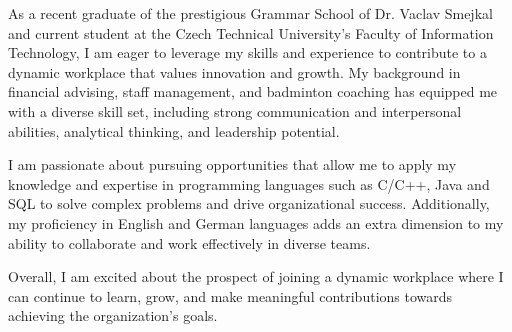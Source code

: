 \documentclass[9pt]{developercv} %
\begin{document}
\vspace{0.5cm}



\begin{minipage}[t]{0.6\textwidth} %
	\vspace{-\baselineskip} %
	
	As a recent graduate of the prestigious Grammar School of Dr. Vaclav Smejkal and current student at the Czech Technical University's Faculty of Information Technology, 
	I am eager to leverage my skills and experience to contribute to a dynamic workplace that values innovation and growth. My background in financial advising, staff management,
	 and badminton coaching has equipped me with a diverse skill set, including strong communication and interpersonal abilities, analytical thinking, and leadership potential.

	I am passionate about pursuing opportunities that allow me to apply my knowledge and expertise in programming languages such as C/C++, Java and SQL
	 to solve complex problems and drive organizational success. Additionally, my proficiency in English and German languages adds an extra dimension to my ability to collaborate and work effectively in
	  diverse teams.

	Overall, I am excited about the prospect of joining a dynamic workplace where I can continue to learn, grow, and make meaningful contributions towards achieving the organization's goals.\\
\end{minipage}
\hfill %
\begin{minipage}[t]{0.4\textwidth} %
	\vspace{1cm}
	\vspace{-\baselineskip} %
	\begin{barchart}{5.5}
	\end{barchart}
\end{minipage}
\end{document}
